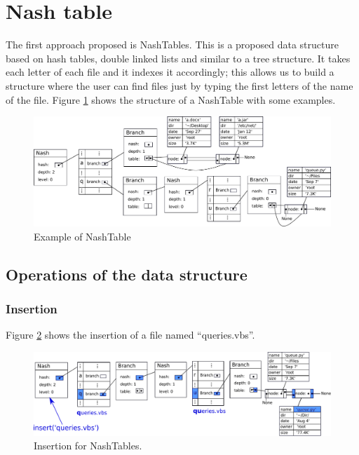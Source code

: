 \documentclass{sig-alternate-05-2015}
\begin{document}
  \section{Nash table}
  The first approach proposed is NashTables. This is a proposed data structure based on hash tables, double linked lists and
  similar to a tree structure. It takes each letter of each file and it indexes it accordingly; this allows us to build a structure where the
  user can find files just by typing the first letters of the name of the file.
  Figure \ref{img:nashT} shows the structure of a NashTable with some examples.
  \begin{figure}[t]
    \centering
    \includegraphics[scale=0.5]{NashTable.pdf}
    \caption{Example of NashTable}
    \label{img:nashT}
  \end{figure}

  \subsection{Operations of the data structure}

    \subsubsection{Insertion}
    Figure \ref{img:nashInsert} shows the insertion of a file named ``queries.vbs''.
    \begin{figure}[t]
      \centering
      \includegraphics[scale=0.445]{NashInsert.pdf}
      \caption{Insertion for NashTables.}
      \label{img:nashInsert}
    \end{figure}
\end{document}
